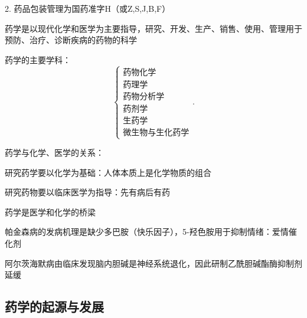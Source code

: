 2. 药品包装管理为国药准字H（或Z,S,J,B,F）

\begin{notation}
    药学是以现代化学和医学为主要指导，研究、开发、生产、销售、使用、管理用于预防、治疗、诊断疾病的药物的科学
\end{notation}
药学的主要学科：
\[
    \begin{cases}
        \mbox{药物化学}\\ 
        \mbox{药理学}\\ 
        \mbox{药物分析学}\\ 
        \mbox{药剂学}\\ 
        \mbox{生药学}\\ 
        \mbox{微生物与生化药学}
    \end{cases}
.\] 
\begin{question}
药学与化学、医学的关系：
\end{question}
\begin{notation}
    研究药学要以化学为基础：人体本质上是化学物质的组合

    研究药物要以临床医学为指导：先有病后有药

    药学是医学和化学的桥梁
\end{notation}
\begin{eg}
    帕金森病的发病机理是缺少多巴胺（快乐因子），5-羟色胺用于抑制情绪：爱情催化剂
\end{eg}
\begin{eg}
    阿尔茨海默病由临床发现脑内胆碱是神经系统退化，因此研制乙酰胆碱酯酶抑制剂延缓
\end{eg}
\subsection{药学的起源与发展}%
\label{sub:药学的起源与发展}
